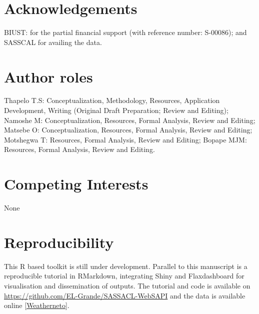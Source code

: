 \documentclass[a4paper, 10pt, conference]{ieeeconf}      %
\begin{document}

 


\section*{\textbf{Acknowledgements}}
	\noindent
BIUST: for the partial financial support (with reference number: S-00086); and SASSCAL  for availing the  data.  

\newpage

\section*{\textbf{Author roles}}
\noindent
Thapelo T.S: Conceptualization, Methodology, Resources, Application Development, Writing (Original Draft Preparation; Review and Editing);
Namoshe M:  Conceptualization, Resources, Formal Analysis, Review and Editing;
 Matsebe O: Conceptualization, Resources, Formal Analysis, Review and  Editing;
 Motshegwa T: Resources, Formal Analysis, Review and Editing; 
Bopape MJM: Resources, Formal Analysis, Review and Editing.

\section*{\textbf{Competing Interests}}
None
\section*{\textbf{Reproducibility}}
\noindent
This  R based toolkit  is still under development. 
Parallel to this manuscript is a reproducible tutorial in RMarkdown, integrating Shiny  and Flaxdashboard for visualisation and dissemination of outputs. %
The tutorial and code is available on \url{https://github.com/EL-Grande/SASSACL-WebSAPI} and the data is available online \ref{Weatherneto}. %






\end{document}
